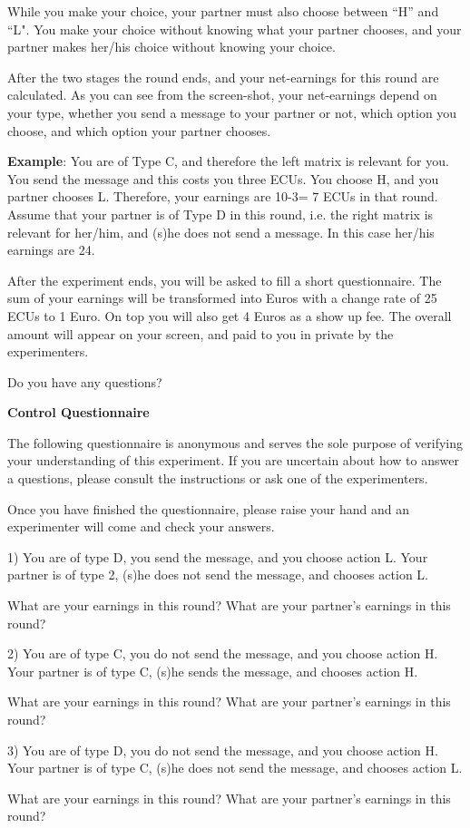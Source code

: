 \documentclass[12pt]{article}
\theoremstyle{break}
\begin{document}
While you make your choice, your partner must also choose between ``H'' and ``L". You make your choice without knowing what your partner chooses, and your partner makes her/his choice without knowing your choice. 

After the two stages the round ends, and your net-earnings for this round are calculated. As you can see from the screen-shot, your net-earnings depend on your type, whether you send a message to your partner or not, which option you choose, and which option your partner chooses. 

\textbf{Example}: You are of Type C, and therefore the left matrix is relevant for you. You send the message and this costs you three ECUs. You choose H, and you partner chooses L. Therefore, your earnings are 10-3= 7 ECUs in that round. Assume that your partner is of Type D in this round, i.e. the right matrix is relevant for her/him, and (s)he does not send a message. In this case her/his earnings are 24. 

After the experiment ends, you will be asked to fill a short questionnaire. The sum of your earnings will be transformed into Euros with a change rate of 25 ECUs to 1 Euro. On top you will also get 4 Euros as a show up fee. The overall amount will appear on your screen, and paid to you in private by the experimenters. 

Do you have any questions? 

\textbf{Control Questionnaire}

The following questionnaire is anonymous and serves the sole purpose of verifying your understanding of this experiment. If you are uncertain about how to answer a questions, please consult the instructions or ask one of the experimenters.

Once you have finished the questionnaire, please raise your hand and an experimenter will come and check your answers.

1) You are of type D, you send the message, and you choose action L. Your partner is of type 2, (s)he does not send the message, and chooses action L.

What are your earnings in this round?
What are your partner’s earnings in this round?

2) You are of type C, you do not send the message, and you choose action H. Your partner is of type C, (s)he sends the message, and chooses action H.

What are your earnings in this round?
What are your partner’s earnings in this round?


3) You are of type D, you do not send the message, and you choose action H. Your partner is of type C, (s)he does not send the message, and chooses action L.

What are your earnings in this round?
What are your partner’s earnings in this round?










\end{document}
